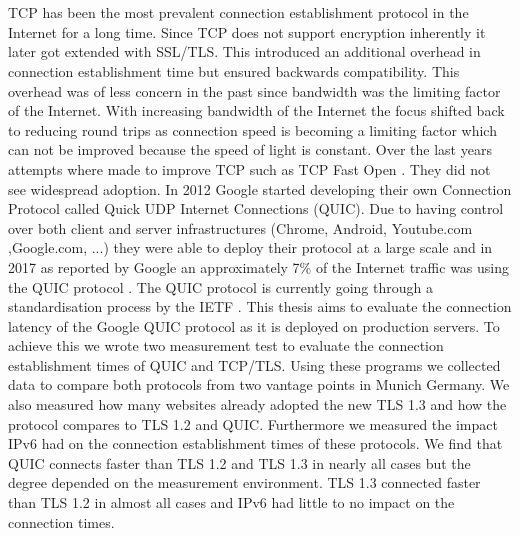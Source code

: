 \chapter{\abstractname}

TCP has been the most prevalent connection establishment protocol in the Internet for a long time.
Since TCP does not support encryption inherently it later got extended with SSL/TLS.
This introduced an additional overhead in connection establishment time but ensured backwards compatibility.
This overhead was of less concern in the past since bandwidth was the limiting factor of the Internet.
With increasing bandwidth of the Internet the focus shifted back to reducing round trips as connection speed is becoming a limiting factor which can not be improved because the speed of light is constant.
Over the last years attempts where made to improve TCP such as TCP Fast Open \cite{Link:TCPFastOpen}.
They did not see widespread adoption.
In 2012 Google started developing their own Connection Protocol called Quick UDP Internet Connections (QUIC).
Due to having control over both client and server infrastructures (Chrome, Android, Youtube.com ,Google.com, ...) they were able to deploy their protocol at a large scale and in 2017 as reported by Google an approximately 7\% of the Internet traffic was using the QUIC protocol \cite{DBLP:conf/sigcomm/LangleyRWVKZYKS17}.
The QUIC protocol is currently going through a standardisation process by the IETF \cite{Link:ietfQuic}.
This thesis aims to evaluate the connection latency of the Google QUIC protocol as it is deployed on production servers.
To achieve this we wrote two measurement test to evaluate the connection establishment times of QUIC and TCP/TLS.
Using these programs we collected data to compare both protocols from two vantage points in Munich Germany.
We also measured how many websites already adopted the new TLS 1.3 and how the protocol compares to TLS 1.2 and QUIC.
Furthermore we measured the impact IPv6 had on the connection establishment times of these protocols.
We find that QUIC connects faster than TLS 1.2 and TLS 1.3 in nearly all cases but the degree depended on the measurement environment.
TLS 1.3 connected faster than TLS 1.2 in almost all cases and IPv6 had little to no impact on the connection times.